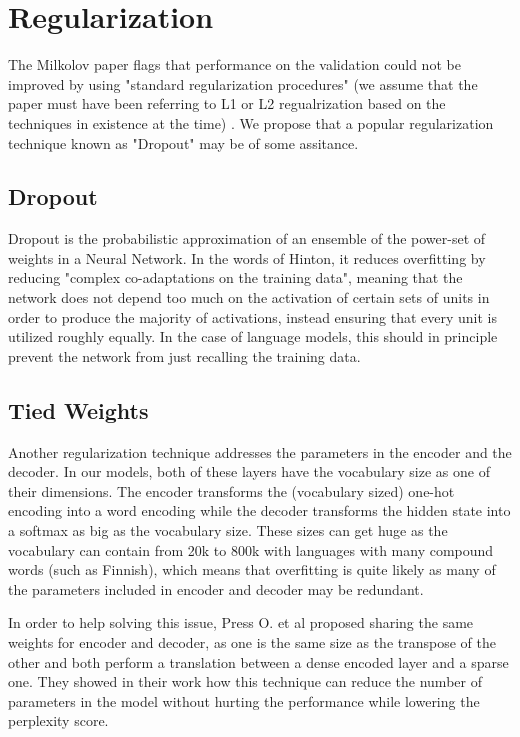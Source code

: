 \documentclass[a4paper]{article}
\begin{document}
\section{Regularization}
\label{sec:regularization}

The Milkolov paper flags that performance on the validation could not be
improved by using "standard regularization procedures" (we assume that
the paper must have been referring to L1 or L2 regualrization based on the
techniques in existence at the time) \cite{Milkolov10}. We propose that a
popular regularization technique known as "Dropout" may be of some assitance.

\subsection{Dropout}
\label{sec:dropout}

Dropout \cite{hinton2012} is the probabilistic approximation of an ensemble
of the power-set of weights in a Neural Network. In the words of Hinton, it
reduces overfitting by reducing "complex co-adaptations on the training data",
meaning that the network does not depend too much on the activation of
certain sets of units in order to produce the majority of activations, instead
ensuring that every unit is utilized roughly equally. In the case of language models,
this should in principle prevent the network from just recalling the training data.

\subsection{Tied Weights}
\label{sec:tiedweights}

Another regularization technique addresses the parameters in the encoder and the decoder. In our models, both of these layers have the vocabulary size as one of their dimensions. The encoder transforms the (vocabulary sized) one-hot encoding into a word encoding while the decoder transforms the hidden state into a softmax as big as the vocabulary size. These sizes can get huge as the vocabulary can contain from 20k to 800k with languages with many compound words (such as Finnish), which means that overfitting is quite likely as many of the parameters included in encoder and decoder may be redundant.

In order to help solving this issue, Press O. et al \cite{press16} proposed sharing the same weights for encoder and decoder, as one is the same size as the transpose of the other and both perform a translation between a dense encoded layer and a sparse one. They showed in their work how this technique can reduce the number of parameters in the model without hurting the performance while lowering the perplexity score.
\end{document}
